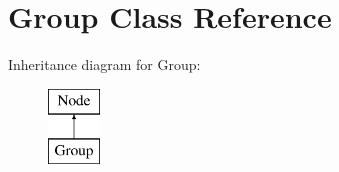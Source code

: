 \hypertarget{class_open_chams_1_1_group}{}\section{Group Class Reference}
\label{class_open_chams_1_1_group}
Inheritance diagram for Group\+:\begin{figure}[H]
\begin{center}
\leavevmode
\includegraphics[height=2.000000cm]{class_open_chams_1_1_group}
\end{center}
\end{figure}
